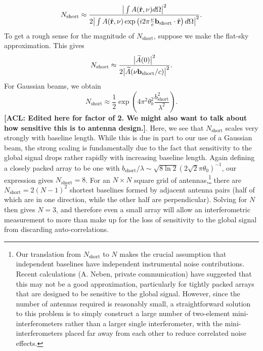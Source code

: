 \documentclass[twocolumn,apj,numberedappendix]{emulateapj}
\newcommand{\rhat}{\hat{\mathbf{r}}}
\newcommand{\acl}[1]{{\color{red} \textbf{[ACL:  #1]}}}
\begin{document}
\begin{equation}
\label{eq:Nshort_curved}
N_\textrm{short} \approx  \frac{\big{|} \int  A(\rhat, \nu) d\Omega \big{|}^2}{  2\big{|} \int  A(\rhat, \nu) \exp\left(i 2\pi \frac{\nu }{c}\mathbf{b}_\textrm{short} \cdot \rhat \right)d\Omega \big{|}^2}.
\end{equation}
To get a rough sense for the magnitude of $N_\textrm{short}$, suppose we make the flat-sky approximation. This gives
\begin{equation}
N_\textrm{short} \approx \frac{\big{|} \widetilde{A}(0)\big{|}^2}{2 \big{|} \widetilde{A}(\nu \mathbf{b}_\textrm{short} / c)\big{|}^2}.
\end{equation}
For Gaussian beams, we obtain
\begin{equation}
N_\textrm{short} \approx \frac{1}{2} \exp \left( 4 \pi^2 \theta_b^2 \frac{b_\textrm{short}^2}{\lambda^2} \right).
\end{equation}
\acl{Edited here for factor of 2. We might also want to talk about how sensitive this is to antenna design.}. Here, we see that $N_\textrm{short}$ scales very strongly with baseline length. While this is due
in part to our use of a Gaussian beam, the strong scaling is fundamentally due to the fact that
sensitivity to the global signal drops rather rapidly with increasing baseline length. Again defining a closely packed array to be one with $b_\textrm{short}/ \lambda \sim \sqrt{8 \ln 2} (2 \sqrt{2} \pi \theta_0)^{-1}$, our expression gives $N_\textrm{short} = 8$. For an $N \times N$ square grid of antennas,\footnote{Our translation from $N_\textrm{short}$ to $N$ makes the crucial assumption that independent baselines have independent instrumental noise contributions. Recent calculations (A. Neben, private communication) have suggested that this may not be a good approximation, particularly for tightly packed arrays that are designed to be sensitive to the global signal. However, since the number of antennas required is reasonably small, a straightforward solution to this problem is to simply construct a large number of two-element mini-interferometers rather than a larger single interferometer, with the mini-interferometers placed far away from each other to reduce correlated noise effects.} there are $N_\textrm{short} = 2(N-1)^2$ shortest baselines formed by adjacent antenna pairs (half of which are in one direction, while the other half are perpendicular). Solving for $N$ then gives $N=3$, and therefore even a small array will allow an interferometric measurement to more than make up for the loss of sensitivity to the global signal from discarding auto-correlations.
\end{document}
